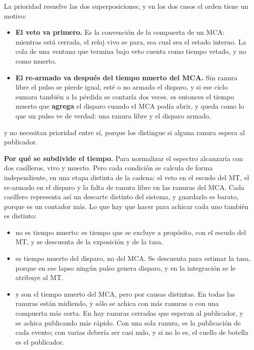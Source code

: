 La prioridad resuelve las dos superposiciones, y en los dos casos el orden tiene
un motivo:
\begin{itemize}
  \item \textbf{El veto va primero.} Es la convención de la compuerta de un
    MCA: mientras está cerrada, el reloj vivo se para, sea cual sea el estado
    interno. La cola de una ventana que termina bajo veto cuenta como tiempo
    vetado, y no como muerto.
  \item \textbf{El re-armado va después del tiempo muerto del MCA.} Sin ranura
    libre el pulso se pierde igual, esté o no armado el disparo, y si ese ciclo
    sumara también a  la pérdida se contaría dos veces.
     es entonces el tiempo muerto que \textbf{agrega} el
    disparo cuando el MCA podía abrir, y  queda como lo que un
    pulso ve de verdad: una ranura libre y el disparo armado.
\end{itemize}
 y  no necesitan prioridad entre sí, porque los
distingue si alguna ranura espera al publicador.

\textbf{Por qué se subdivide el tiempo.} Para normalizar el espectro alcanzaría
con dos casilleros, vivo y muerto. Pero cada condición se calcula de forma
independiente, en una etapa distinta de la cadena: el veto en el escudo del MT,
el re-armado en el disparo y la falta de ranura libre en las ranuras del MCA.
Cada casillero representa así un descarte distinto del sistema, y guardarlo es
barato, porque es un contador más. Lo que hay que hacer para achicar cada uno
también es distinto:
\begin{itemize}
  \item {} no es tiempo muerto: es tiempo que se excluye a
    propósito, con el escudo del MT, y se descuenta de la exposición y de la
    tasa.
  \item {} es tiempo muerto del disparo, no del MCA. Se descuenta
    para estimar la tasa, porque en ese lapso ningún pulso genera disparo, y en
    la integración se le atribuye al MT.
  \item {} y  son el tiempo muerto del MCA, pero por
    causas distintas. En  todas las ranuras están midiendo, y
    sólo se achica con más ranuras o con una compuerta más corta. En
     hay ranuras cerradas que esperan al publicador, y se achica
    publicando más rápido. Con una sola ranura,  es la
    publicación de cada evento; con varias debería ser casi nulo, y si no lo
    es, el cuello de botella es el publicador.
\end{itemize}

